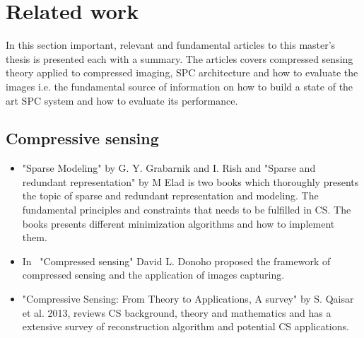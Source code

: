 \section{Related work}
In this section important, relevant and fundamental articles to this master's thesis is presented each with a summary. The articles covers compressed sensing theory applied to compressed imaging, SPC architecture and how to evaluate the images i.e. the fundamental source of information on how to build a state of the art SPC system and how to evaluate its performance. 

\subsection{Compressive sensing}
\begin{itemize}


\item \cite{book:sm, book:srr} "Sparse Modeling" by G. Y. Grabarnik and  I. Rish and "Sparse and redundant representation" by M Elad is two books which thoroughly presents the topic of sparse and redundant representation and modeling. The fundamental principles and constraints that needs to be fulfilled in CS. The books presents different minimization algorithms and how to implement them.   

\item In~\cite{article:CS_donoho1} "Compressed sensing" David L. Donoho proposed the framework of compressed sensing and the application of images capturing.

\item \cite{article:CS_from_theory_a_sur} "Compressive Sensing: From Theory to Applications, A survey" by S. Qaisar et al. 2013, reviews CS background, theory and mathematics and has a extensive survey of reconstruction algorithm and potential CS applications.

\end{itemize}

